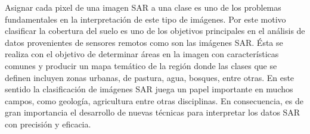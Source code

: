 \documentclass[11pt]{article}
\begin{document}


Asignar cada pixel de una imagen SAR a una clase es uno de los problemas fundamentales en la interpretación de este tipo de imágenes. Por este motivo clasificar la cobertura del suelo es uno de los objetivos principales en el análisis de datos provenientes de sensores remotos como son las imágenes SAR. Ésta se realiza con el objetivo de determinar áreas en la imagen con características comunes  y producir un mapa temático de la región donde las clases que se definen incluyen zonas urbanas, de pastura, agua, bosques, entre otras. En este sentido la clasificación de imágenes SAR juega un papel importante en muchos campos, como geología, agricultura entre otras disciplinas. En consecuencia, es de gran importancia el desarrollo de nuevas técnicas para interpretar los datos SAR con precisión y eficacia.
\end{document}
